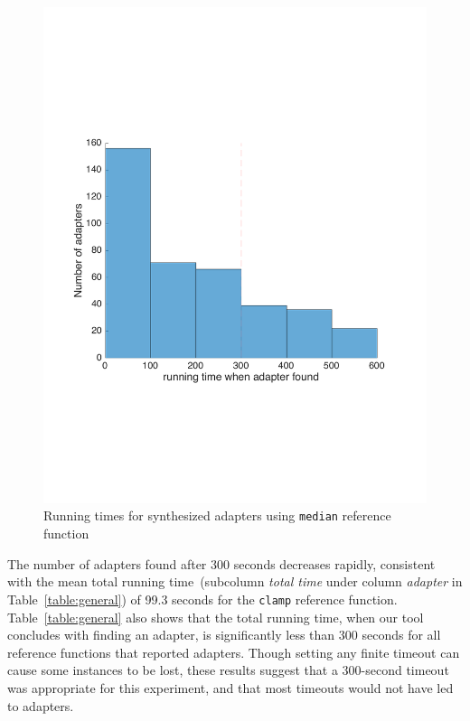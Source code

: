 \begin{figure}[ht]
    \centering
    \includegraphics[width=\widthfactor\textwidth]{chapters/adapter_synthesis/figures/median_hist}
    \caption{Running times for synthesized adapters using {\tt median} reference function}
    \label{fig:median_hist}
\end{figure}
%
The number of adapters found after 300 seconds decreases rapidly, consistent with the mean total running time~(subcolumn \textit{total time} under column \textit{adapter} in Table~\ref{table:general}) of 99.3 seconds for the {\tt clamp} reference function.
%
Table~\ref{table:general} also shows that the total running time, when our tool concludes with finding an adapter, is significantly less than 300 seconds for all reference functions that reported adapters.
%
Though setting any finite timeout can cause some instances to be lost,
these results suggest that a 300-second timeout was appropriate for
this experiment, and that most timeouts would not have led to adapters.